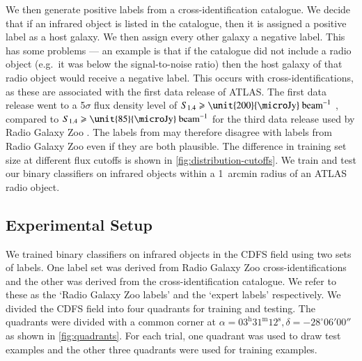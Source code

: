 \documentclass[fleqn,usenatbib,usedcolumn]{mnras}
\newcommand{\jansky}{\text{Jy}}
\begin{document}
    We then generate positive labels from a cross-identification catalogue.
    We decide that if an infrared object is listed in the catalogue, then it
    is assigned a positive label as a host galaxy. We then assign every other galaxy a negative label. This has some problems
    --- an example is that if the catalogue did not include a radio
    object (e.g.~it was below the signal-to-noise ratio) then the host galaxy
    of that radio object would receive a negative label. This occurs with
    \citet{norris06} cross-identifications, as these are associated with the
    first data release of ATLAS. The first data release went to a 5$\sigma$
    flux density level of $S_{1.4} \geq \unit{200}{\micro\jansky}\text{
    beam}^{-1}$ \citep{norris06}, compared to $S_{1.4} \geq \unit{85}{\micro\jansky}\text{
    beam}^{-1}$ for the third data release used by Radio Galaxy Zoo
    \citep{franzen15}. The labels from \citet{norris06} may therefore disagree with labels
    from Radio Galaxy Zoo even if they are both plausible. The difference in
    training set size at different flux cutoffs is shown in
    \autoref{fig:distribution-cutoffs}. We train and test our binary classifiers on infrared objects within a 1~arcmin radius of an ATLAS radio object.

  \subsection{Experimental Setup}
  \label{sec:experimental-setup}

    We trained binary classifiers on infrared objects in the CDFS field using two sets of labels. One label set was derived from
    Radio Galaxy Zoo cross-identifications and the other was derived from the
    \citet{norris06} cross-identification catalogue. We refer to these as the
    `Radio Galaxy Zoo labels' and the `expert labels' respectively. We divided the
    CDFS field into four quadrants for training and testing. The quadrants
    were divided with a common corner at $\alpha = 03^\text{h}31^\text{m}12^\text{s},
    \delta = -28^\circ{}06'00''$ as shown in \autoref{fig:quadrants}. For
    each trial, one quadrant was used to draw test examples and the other three
    quadrants were used for training examples.
\end{document}
